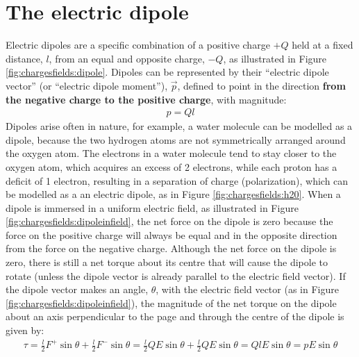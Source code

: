 \section{The electric dipole}
\label{sec:chargesfields:electricdipole}
Electric dipoles are a specific combination of a positive charge $+Q$ held at a fixed distance, $l$, from an equal and opposite charge, $-Q$, as illustrated in Figure \ref{fig:chargesfields:dipole}.
Dipoles can be represented by their ``electric dipole vector'' (or ``electric dipole moment''), $\vec p$, defined to point in the direction \textbf{from the negative charge to the positive charge}, with magnitude:
\begin{align*}
p=Ql
\end{align*}
Dipoles arise often in nature, for example, a water molecule can be modelled as a dipole, because the two hydrogen atoms are not symmetrically arranged around the oxygen atom. The electrons in a water molecule tend to stay closer to the oxygen atom, which acquires an excess of 2 electrons, while each proton has a deficit of 1 electron, resulting in a separation of charge (polarization), which can be modelled as a an electric dipole, as in Figure \ref{fig:chargesfields:h20}.
When a dipole is immersed in a uniform electric field, as illustrated in Figure \ref{fig:chargesfields:dipoleinfield}, the net force on the dipole is zero because the force on the positive charge will always be equal and in the opposite direction from the force on the negative charge. 
Although the net force on the dipole is zero, there is still a net torque about its centre that will cause the dipole to rotate (unless the dipole vector is already parallel to the electric field vector). If the dipole vector makes an angle, $\theta$, with the electric field vector (as in Figure \ref{fig:chargesfields:dipoleinfield}), the magnitude of the net torque on the dipole about an axis perpendicular to the page and through the centre of the dipole is given by:
\begin{align*}
\tau=\frac{l}{2}F^+\sin\theta+\frac{l}{2}F^-\sin\theta=\frac{l}{2}QE\sin\theta+\frac{l}{2}QE\sin\theta=QlE\sin\theta=pE\sin\theta
\end{align*}
